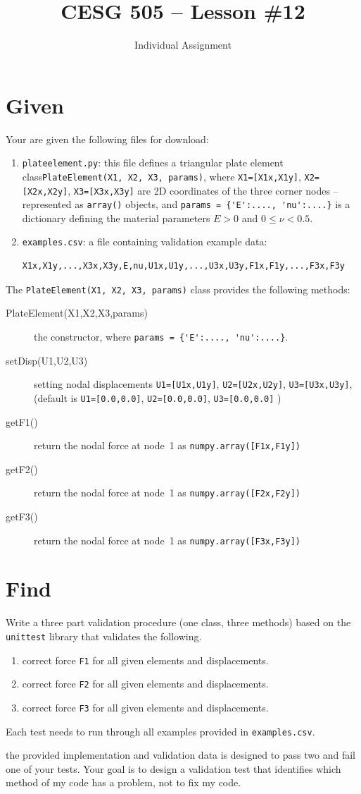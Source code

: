 \documentclass[11pt, oneside]{article}   	%
\title{CESG 505 -- Lesson \#12}
\author{Individual Assignment}
\begin{document}
\thispagestyle{fancy}

\section{Given}
Your are given the following files for download:
\begin{enumerate}
\item 
	{\tt plateelement.py}: this file defines a triangular plate element class\linebreak \verb+PlateElement(X1, X2, X3, params)+, where
	\verb+X1=[X1x,X1y]+, \verb+X2=[X2x,X2y]+, \linebreak \verb+X3=[X3x,X3y]+ are 2D coordinates of the three corner nodes -- represented as \verb+array()+ objects,
	and  \verb+params = {'E':...., 'nu':....}+ is a dictionary defining the material parameters $E>0$ and $0\le\nu<0.5$.
\item 
        {\tt examples.csv}: a file containing validation example data:
        {\small
	\begin{lstlisting}[frame=trBL]
X1x,X1y,...,X3x,X3y,E,nu,U1x,U1y,...,U3x,U3y,F1x,F1y,...,F3x,F3y
	\end{lstlisting}
	}
\end{enumerate}
The \verb+PlateElement(X1, X2, X3, params)+ class provides the following methods:
\begin{description}
\item[{PlateElement(X1,X2,X3,params)}] the constructor, where \verb+params = {'E':...., 'nu':....}+.
\item[{setDisp(U1,U2,U3)}] setting nodal displacements 
        \verb+U1=[U1x,U1y]+,  \verb+U2=[U2x,U2y]+,  \verb+U3=[U3x,U3y]+, 
        (default is  \verb+U1=[0.0,0.0]+,  \verb+U2=[0.0,0.0]+,  \verb+U3=[0.0,0.0]+ )
\item[{getF1()}] return the nodal force at node~1 as \verb+numpy.array([F1x,F1y])+
\item[{getF2()}] return the nodal force at node~1 as \verb+numpy.array([F2x,F2y])+
\item[{getF3()}] return the nodal force at node~1 as \verb+numpy.array([F3x,F3y])+
\end{description}

\section{Find}
Write a three part validation procedure (one class, three methods) based on the \verb+unittest+ library that validates the following.
\begin{enumerate}
\item correct force \verb+F1+ for all given elements and displacements.
\item correct force \verb+F2+ for all given elements and displacements.
\item correct force \verb+F3+ for all given elements and displacements.
\end{enumerate}
Each test needs to run through all examples provided in {\tt examples.csv}.
\bigskip

 the provided implementation and validation data is designed to pass two and fail one of your tests. Your goal is to design a validation test that identifies which method of my code has a problem, not to fix my code.
\end{document}
